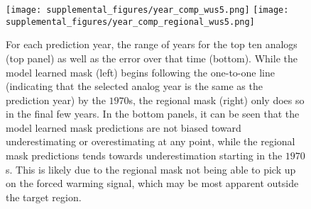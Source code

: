 
\begin{figure}[h!]
    \centering
    \texttt{[image: supplemental\_figures/year\_comp\_wus5.png]}
    \texttt{[image: supplemental\_figures/year\_comp\_regional\_wus5.png]}
    \caption[Analog year versus prediction year]{
        For each prediction year, the range of years for the top ten analogs (top panel) as well as the error over that time (bottom).
        While the model learned mask (left) begins following the one-to-one line (indicating that the selected analog year is the same as the prediction year) by the $1970$s, the regional mask (right) only does so in the final few years.
        In the bottom panels, it can be seen that the model learned mask predictions are not biased toward underestimating or overestimating at any point, while the regional mask predictions tends towards underestimation starting in the $1970$s.
        This is likely due to the regional mask not being able to pick up on the forced warming signal, which may be most apparent outside the target region.
    }
    \label{fig:year_comp}
\end{figure}

